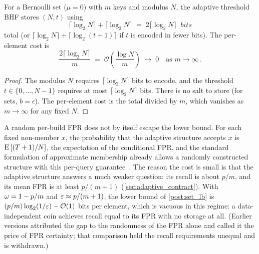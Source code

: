\begin{theorem}
\label{thm:adaptive_space}
For a Bernoulli set ($\mu = 0$) with $m$ keys and modulus $N$, the adaptive
threshold BHF stores $(N, t)$ using
\begin{equation}
\label{eq:adaptive_bits}
    \lceil \log_2 N \rceil + \lceil \log_2 N \rceil
    \;=\; 2\lceil \log_2 N \rceil \;\;\si{bits}
\end{equation}
total (or $\lceil \log_2 N \rceil + \lceil \log_2(t+1) \rceil$ if $t$ is
encoded in fewer bits).
The per-element cost is
\begin{equation}
\label{eq:adaptive_per_element}
    \frac{2\lceil \log_2 N \rceil}{m} \;=\; \mathcal{O}\!\left(\frac{\log N}{m}\right) \;\to\; 0
    \quad\text{as } m \to \infty\,.
\end{equation}
\end{theorem}
\begin{proof}
The modulus $N$ requires $\lceil \log_2 N \rceil$ bits to encode, and the
threshold $t \in \{0,\ldots,N-1\}$ requires at most $\lceil \log_2 N \rceil$
bits.
There is no salt to store (for sets, $b = \epsilon$).
The per-element cost is the total divided by $m$, which vanishes as
$m \to \infty$ for any fixed $N$.
\end{proof}

\begin{remark}
\label{rem:lb_not_violated}
A random per-build FPR does not by itself escape the lower bound.
For each fixed non-member $x$, the probability that the adaptive structure
accepts $x$ is $\Expect{(T+1)/N}$, the expectation of the conditional FPR, and
the standard formulation of approximate membership already allows a randomly
constructed structure with this per-query guarantee~\cite{pagh2005}.
The reason the cost is small is that the adaptive structure answers a much
weaker question: its recall is about $p/m$, and its mean FPR is at least
$p/(m+1)$ (\cref{sec:adaptive_contract}).
With $\omega = 1 - p/m$ and $\varepsilon \approx p/(m+1)$, the lower bound of
\cref{post:set_lb} is $(p/m)\log_2(1/\varepsilon) - \mathcal{O}(1)$ bits per
element, which is vacuous in this regime: a data-independent coin achieves
recall equal to its FPR with no storage at all.
(Earlier versions attributed the gap to the randomness of the FPR alone and
called it the price of FPR certainty; that comparison held the recall
requirements unequal and is withdrawn.)
\end{remark}

